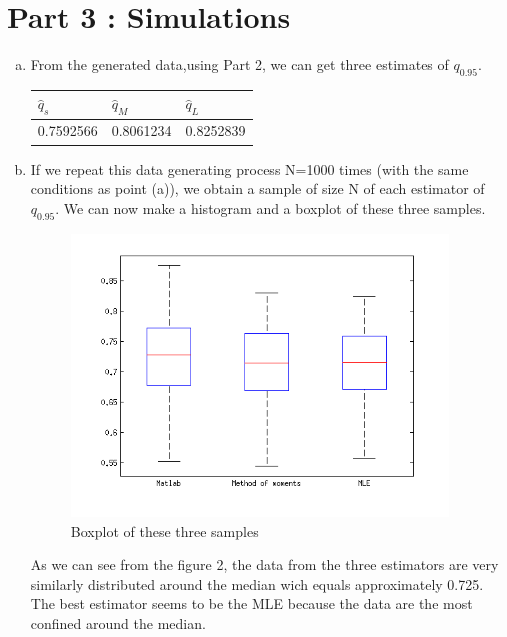 \documentclass[a4paper]{article}
\begin{document}

\section{Part 3 : Simulations}

\begin{enumerate}[(a)]

\item From the generated data,using Part 2, we can get three estimates of $q_{0.95}$.
\\

\begin{center}
    \begin{tabular}{ | l | l | l | }
    \hline
      $\hat{q}_s$ & $\hat{q}_M$ & $\hat{q}_L$
     \\ \hline
     0.7592566 & 0.8061234 & 0.8252839 \\ \hline
    \end{tabular}
\end{center}

\item If we repeat this data generating process N=1000 times (with the same conditions as point (a)), we obtain a sample of size N of  each estimator of $q_{0.95}$. We can now make a histogram and a boxplot of these three samples. 

\begin{figure}[!h]
    \centering
  \includegraphics[width = 10cm]{img/boxplot.png}
  \caption{Boxplot of these three samples}
\end{figure}

As we can see from the figure 2, the data  from the three estimators are very similarly distributed around the median wich equals approximately 0.725. The best estimator seems to be the MLE because the data are the most confined around the median.


\end{enumerate}
\end{document}
